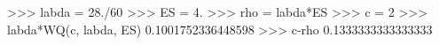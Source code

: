 
>>> labda = 28./60
>>> ES = 4.
>>> rho = labda*ES
>>> c = 2
>>> labda*WQ(c, labda, ES)
0.1001752336448598
>>> c-rho
0.1333333333333333

